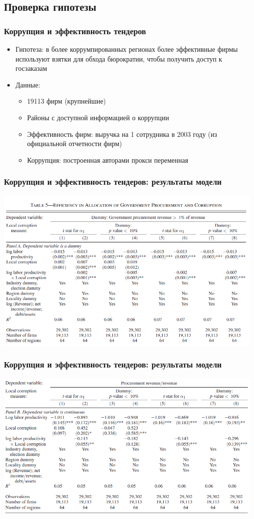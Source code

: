 \subsection{Проверка гипотезы}
\begin{frame}
\frametitle{Коррупция и эффективность тендеров}
	\begin{itemize}
		\item Гипотеза: в более коррумпированных регионах более эффективные фирмы используют взятки для обхода бюрократии, чтобы получить доступ к госзаказам
		\item Данные:
		\begin{itemize}
			\item 19113 фирм (крупнейшие)
			\item Районы с доступной информацией о коррупции
			\item Эффективность фирм: выручка на 1 сотрудника в 2003 году (из официальной отчетности фирм)
			\item Коррупция: построенная авторами прокси переменная
		\end{itemize}
	\end{itemize}
\end{frame}


\begin{frame}
\frametitle{Коррупция и эффективность тендеров: результаты модели}
	\includegraphics[scale=0.38]{images/kek2}
\end{frame}


\begin{frame}
\frametitle{Коррупция и эффективность тендеров: результаты модели}
	\includegraphics[scale=0.38]{images/kek3}
\end{frame}


